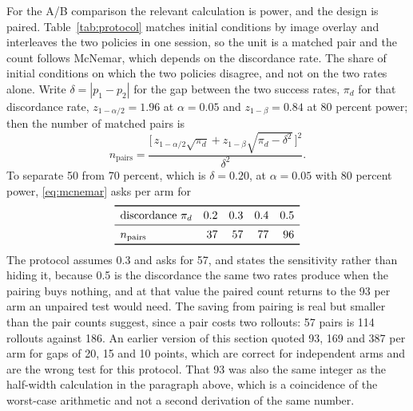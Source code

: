 For the A/B comparison the relevant calculation is power, and the design is paired.
Table~\ref{tab:protocol} matches initial conditions by image overlay and interleaves the two
policies in one session, so the unit is a matched pair and the count follows McNemar, which depends
on the discordance rate. The share of initial conditions on which the two policies disagree, and
not on the two rates alone. Write $\delta = |p_{1} - p_{2}|$ for the gap between the two success
rates, $\pi_{d}$ for that discordance rate, $z_{1-\alpha/2} = 1.96$ at $\alpha = 0.05$ and
$z_{1-\beta} = 0.84$ at 80 percent power; then the number of matched pairs is
\begin{equation}
n_{\mathrm{pairs}} =
  \frac{\bigl[\,z_{1-\alpha/2}\sqrt{\pi_{d}}
              + z_{1-\beta}\sqrt{\pi_{d} - \delta^{2}}\,\bigr]^{2}}{\delta^{2}}.
\label{eq:mcnemar}
\end{equation}
To separate 50 from 70 percent, which is $\delta = 0.20$, at $\alpha = 0.05$ with 80 percent power,
\eqref{eq:mcnemar} asks per arm for
\begin{equation*}
\begin{array}{lrrrr}
\toprule
\text{discordance } \pi_{d} & 0.2 & 0.3 & 0.4 & 0.5\\
\midrule
n_{\mathrm{pairs}} & 37 & 57 & 77 & 96\\
\bottomrule
\end{array}
\end{equation*}
The protocol assumes 0.3 and asks for 57, and states the sensitivity rather than hiding it, because
0.5 is the discordance the same two rates produce when the pairing buys nothing, and at that value
the paired count returns to the 93 per arm an unpaired test would need. The saving from pairing is
real but smaller than the pair counts suggest, since a pair costs two rollouts: 57 pairs is 114
rollouts against 186. An earlier version of this section quoted 93, 169 and 387 per arm for gaps of
20, 15 and 10 points, which are correct for independent arms and are the wrong test for this
protocol. That 93 was also the same integer as the half-width calculation in the paragraph above,
which is a coincidence of the worst-case arithmetic and not a second derivation of the same number.

